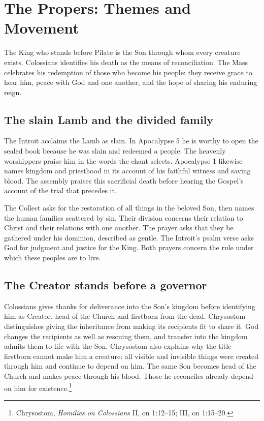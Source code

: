 \clearpage
\section{The Propers: Themes and Movement}
The King who stands before Pilate is the Son through whom every creature exists. Colossians identifies his death as the means of reconciliation. The Mass celebrates his redemption of those who become his people: they receive grace to hear him, peace with God and one another, and the hope of sharing his enduring reign.

\subsection{The slain Lamb and the divided family}
The Introit acclaims the Lamb as slain. In Apocalypse 5 he is worthy to open the sealed book because he was slain and redeemed a people. The heavenly worshippers praise him in the words the chant selects. Apocalypse 1 likewise names kingdom and priesthood in its account of his faithful witness and saving blood. The assembly praises this sacrificial death before hearing the Gospel's account of the trial that precedes it.

The Collect asks for the restoration of all things in the beloved Son, then names the human families scattered by sin. Their division concerns their relation to Christ and their relations with one another. The prayer asks that they be gathered under his dominion, described as gentle. The Introit's psalm verse asks God for judgment and justice for the King. Both prayers concern the rule under which these peoples are to live.

\subsection{The Creator stands before a governor}
Colossians gives thanks for deliverance into the Son's kingdom before identifying him as Creator, head of the Church and firstborn from the dead. Chrysostom distinguishes giving the inheritance from making its recipients fit to share it. God changes the recipients as well as rescuing them, and transfer into the kingdom admits them to life with the Son. Chrysostom also explains why the title firstborn cannot make him a creature: all visible and invisible things were created through him and continue to depend on him. The same Son becomes head of the Church and makes peace through his blood. Those he reconciles already depend on him for existence.\footnote{Chrysostom, \emph{Homilies on Colossians} II, on 1:12--15; III, on 1:15--20.}

